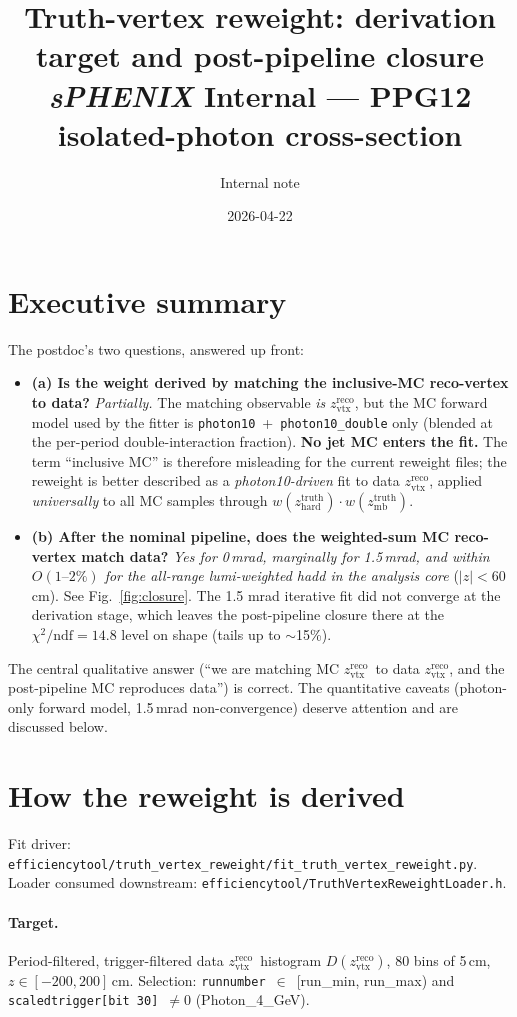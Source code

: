 \documentclass[11pt,a4paper]{article}
\title{\large\textbf{Truth-vertex reweight: derivation target and post-pipeline closure}\\[2pt]
\normalsize\textbf{\textit{sPHENIX} Internal} --- PPG12 isolated-photon cross-section}
\author{Internal note}
\date{2026-04-22}
\newcommand{\zhard}{\ensuremath{z_{\mathrm{hard}}^{\mathrm{truth}}}\xspace}
\newcommand{\zmb}{\ensuremath{z_{\mathrm{mb}}^{\mathrm{truth}}}\xspace}
\newcommand{\zreco}{\ensuremath{z^{\mathrm{reco}}_{\mathrm{vtx}}}\xspace}
\newcommand{\chidf}{\ensuremath{\chi^{2}/\mathrm{ndf}}\xspace}
\begin{document}
\maketitle

\section*{Executive summary}
The postdoc's two questions, answered up front:

\begin{itemize}
  \item \textbf{(a) Is the weight derived by matching the inclusive-MC reco-vertex to data?}
        \emph{Partially.} The matching observable \emph{is} \zreco, but the MC forward model used by the fitter is \texttt{photon10}~+~\texttt{photon10\_double} only (blended at the per-period double-interaction fraction). \textbf{No jet MC enters the fit.} The term ``inclusive MC'' is therefore misleading for the current reweight files; the reweight is better described as a \emph{photon10-driven} fit to data \zreco, applied \emph{universally} to all MC samples through $w(\zhard)\cdot w(\zmb)$.

  \item \textbf{(b) After the nominal pipeline, does the weighted-sum MC reco-vertex match data?}
        \emph{Yes for 0\,mrad, marginally for 1.5\,mrad, and within $O(1\text{--}2\%)$ for the all-range lumi-weighted hadd in the analysis core} ($|z|<60$ cm). See Fig.~\ref{fig:closure}. The 1.5 mrad iterative fit did not converge at the derivation stage, which leaves the post-pipeline closure there at the $\chidf=14.8$ level on shape (tails up to $\sim$15\%).
\end{itemize}

The central qualitative answer (``we are matching MC \zreco\ to data \zreco, and the post-pipeline MC reproduces data'') is correct. The quantitative caveats (photon-only forward model, 1.5\,mrad non-convergence) deserve attention and are discussed below.

\section{How the reweight is derived}

Fit driver: \texttt{efficiencytool/truth\_vertex\_reweight/fit\_truth\_vertex\_reweight.py}.
Loader consumed downstream: \texttt{efficiencytool/TruthVertexReweightLoader.h}.

\paragraph{Target.} Period-filtered, trigger-filtered data \zreco\ histogram $D(\zreco)$, 80 bins of 5\,cm, $z \in [-200,200]$\,cm. Selection: \texttt{runnumber}~$\in$~[run\_min, run\_max) and \texttt{scaledtrigger[bit~30]}~$\neq 0$ (Photon\_4\_GeV).
\end{document}
